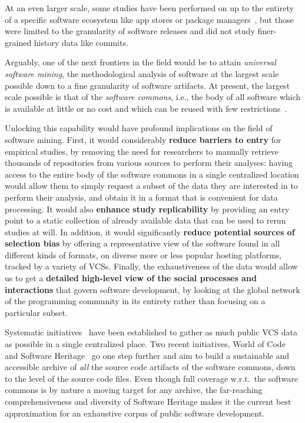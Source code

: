 At an even larger scale, some studies have been performed on up to the entirety
of a specific software ecosystem like app stores or package
managers~\cite{gonzalez2009macro,debsources-ese-2016}, but those were limited
to the granularity of software releases and did not study finer-grained history
data like commits.

Arguably, one of the next frontiers in the field would be to attain
\emph{universal software mining}, the methodological analysis of software at
the largest scale possible down to a fine granularity of software artifacts.
At present, the largest scale possible is that of the \emph{software commons},
i.e., the body of all software which is available at little or no cost and
which can be reused with few
restrictions~\cite{1999-beagle-in-commons,kranich2008information}.

Unlocking this capability would have profound implications on the field of
software mining. First, it would considerably \textbf{reduce barriers to entry}
for empirical studies, by removing the need for researchers to manually
retrieve thousands of repositories from various sources to perform their
analyses: having access to the entire body of the software commons in a single
centralized location would allow them to simply request a subset of the data
they are interested in to perform their analysis, and obtain it in a format
that is convenient for data processing. It would also \textbf{enhance study
replicability} by providing an entry point to a static collection of already
available data that can be used to rerun studies at will.
In addition, it would significantly \textbf{reduce potential sources of
selection bias} by offering a representative view of the software found in
all different kinds of formats, on diverse more or less popular hosting
platforms, tracked by a variety of \glspl{VCS}.  Finally, the exhaustiveness of
the data would allow us to get a \textbf{detailed high-level view of the social
processes and interactions} that govern software development, by looking at the
global network of the programming community in its entirety rather than
focusing on a particular subset.

Systematic initiatives~\cite{flossmole2006,gao2007archive,mockus2009}
have been established to gather as much public \gls{VCS} data as possible in a
single centralized place. Two recent initiatives, World of
Code~\cite{mockus2019woc} and Software Heritage~\cite{swhipres2017,
swhcacm2018} go one step further and aim to build a sustainable and accessible
archive of \emph{all} the source code artifacts of the software commons, down
to the level of the source code files. Even though full coverage w.r.t.\ the
software commons is by nature a moving target for any archive, the far-reaching
comprehensiveness and diversity of Software Heritage makes it the current best
approximation for an exhaustive corpus of public software development.

